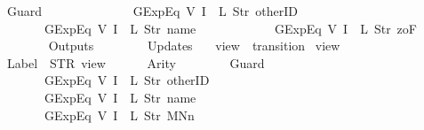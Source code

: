 \begin{isabellebody}
\ \ \ \ \ \ Guard\ {\isacharequal}\ {\isacharbrackleft}\isanewline
\ \ \ \ \ \ \ \ \ \ \ \ GExp{\isachardot}Eq\ {\isacharparenleft}V\ {\isacharparenleft}I\ {}{\isacharparenright}{\isacharparenright}\ {\isacharparenleft}L\ {\isacharparenleft}Str\ {\isacharprime}{\isacharprime}otherID{\isacharprime}{\isacharprime}{\isacharparenright}{\isacharparenright}{\isacharcomma}\isanewline
\ \ \ \ \ \ \ \ \ \ \ \ GExp{\isachardot}Eq\ {\isacharparenleft}V\ {\isacharparenleft}I\ {}{\isacharparenright}{\isacharparenright}\ {\isacharparenleft}L\ {\isacharparenleft}Str\ {\isacharprime}{\isacharprime}name{\isacharprime}{\isacharprime}{\isacharparenright}{\isacharparenright}{\isacharcomma}\isanewline
\ \ \ \ \ \ \ \ \ \ \ \ GExp{\isachardot}Eq\ {\isacharparenleft}V\ {\isacharparenleft}I\ {}{\isacharparenright}{\isacharparenright}\ {\isacharparenleft}L\ {\isacharparenleft}Str\ {\isacharprime}{\isacharprime}{}zoF{\isacharprime}{\isacharprime}{\isacharparenright}{\isacharparenright}\isanewline
\ \ \ \ \ \ {\isacharbrackright}{\isacharcomma}\isanewline
\ \ \ \ \ \ Outputs\ {\isacharequal}\ {\isacharbrackleft}{\isacharbrackright}{\isacharcomma}\isanewline
\ \ \ \ \ \ Updates\ {\isacharequal}\ {\isacharbrackleft}{\isacharbrackright}\isanewline
{\isasymrparr}{\isachardoublequoteclose}\isanewline
\isanewline
{}\isamarkupfalse%
\ {\isachardoublequoteopen}view{}{\isachardoublequoteclose}\ {\isacharcolon}{\isacharcolon}\ {\isachardoublequoteopen}transition{\isachardoublequoteclose}\ \isanewline
{\isachardoublequoteopen}view{}\ {\isasymequiv}\ {\isasymlparr}\isanewline
\ \ \ \ \ \ Label\ {\isacharequal}\ STR\ {\isacharprime}{\isacharprime}view{\isacharprime}{\isacharprime}{\isacharcomma}\isanewline
\ \ \ \ \ \ Arity\ {\isacharequal}\ {}{\isacharcomma}\isanewline
\ \ \ \ \ \ Guard\ {\isacharequal}\ {\isacharbrackleft}\isanewline
\ \ \ \ \ \ \ \ \ \ \ \ GExp{\isachardot}Eq\ {\isacharparenleft}V\ {\isacharparenleft}I\ {}{\isacharparenright}{\isacharparenright}\ {\isacharparenleft}L\ {\isacharparenleft}Str\ {\isacharprime}{\isacharprime}otherID{\isacharprime}{\isacharprime}{\isacharparenright}{\isacharparenright}{\isacharcomma}\isanewline
\ \ \ \ \ \ \ \ \ \ \ \ GExp{\isachardot}Eq\ {\isacharparenleft}V\ {\isacharparenleft}I\ {}{\isacharparenright}{\isacharparenright}\ {\isacharparenleft}L\ {\isacharparenleft}Str\ {\isacharprime}{\isacharprime}name{\isacharprime}{\isacharprime}{\isacharparenright}{\isacharparenright}{\isacharcomma}\isanewline
\ \ \ \ \ \ \ \ \ \ \ \ GExp{\isachardot}Eq\ {\isacharparenleft}V\ {\isacharparenleft}I\ {}{\isacharparenright}{\isacharparenright}\ {\isacharparenleft}L\ {\isacharparenleft}Str\ {\isacharprime}{\isacharprime}MNn{}{\isacharprime}{\isacharprime}{\isacharparenright}{\isacharparenright}\isanewline

\end{isabellebody}
